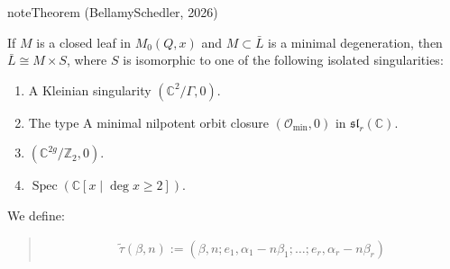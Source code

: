 \documentclass[letterpaper,10pt,english]{sphinxmanual}
\begin{document}
\begin{sphinxadmonition}{note}{Theorem (Bellamy\sphinxhyphen{}Schedler, 2026)}

\sphinxAtStartPar
If \(M\) is a closed leaf in \(M_0(Q,x)\) and \(M\subset\bar{L}\) is a minimal degeneration, then \(\bar{L}\cong M\times S\), where \(S\) is isomorphic to one of the following isolated singularities:
\begin{enumerate}
%
\item {} 
\sphinxAtStartPar
A Kleinian singularity \((\mathbb{C}^2/\Gamma, 0)\).

\item {} 
\sphinxAtStartPar
The type A minimal nilpotent orbit closure \((\mathcal{O}_{\min},0)\) in \(\mathfrak{sl}_r(\mathbb{C})\).

\item {} 
\sphinxAtStartPar
\((\mathbb{C}^{2g}/\mathbb{Z}_2,0)\).

\item {} 
\sphinxAtStartPar
\(\operatorname{Spec}(\mathbb{C}[x\mid\deg x\geq 2])\).

\end{enumerate}
\end{sphinxadmonition}

\sphinxAtStartPar
We define:
\begin{quote}
\begin{equation*}
\begin{split}\tilde{\tau}(\beta,n):=(\beta,n;e_1,\alpha_1-n\beta_1;\dots;e_r,\alpha_r-n\beta_r)\end{split}
\end{equation*}\end{quote}
\end{document}
